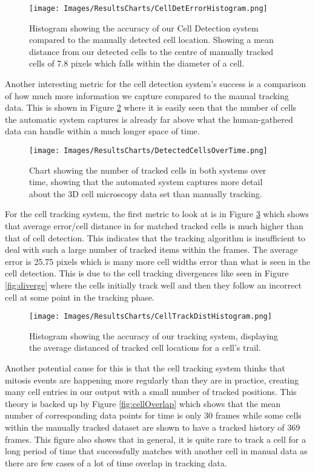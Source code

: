\documentclass[12pt a4paper]{article}
\begin{document}
\begin{figure}
    \centering
    \texttt{[image: Images/ResultsCharts/CellDetErrorHistogram.png]}
    \caption{Histogram showing the accuracy of our Cell Detection system compared to the manually detected cell location. Showing a mean distance from our detected cells to the centre of manually tracked cells of 7.8 pixels which falls within the diameter of a cell.}
    \label{fig:CellDetError}
\end{figure}

Another interesting metric for the cell detection system's success is a comparison of how much more information we capture compared to the manual tracking data. This is shown in Figure \ref{fig:numCellsDet} where it is easily seen that the number of cells the automatic system captures is already far above what the human-gathered data can handle within a much longer space of time.
\begin{figure}
    \centering
    \texttt{[image: Images/ResultsCharts/DetectedCellsOverTime.png]}
    \caption{Chart showing the number of tracked cells in both systems over time, showing that the automated system captures more detail about the 3D cell microscopy data set than manually tracking.}
    \label{fig:numCellsDet}
\end{figure}

For the cell tracking system, the first metric to look at is in Figure \ref{fig:cellTrackError} which shows that average error/cell distance in for matched tracked cells is much higher than that of cell detection. This indicates that the tracking algorithm is insufficient to deal with such a large number of tracked items within the frames. The average error is 25.75 pixels which is many more cell widths error than what is seen in the cell detection. This is due to the cell tracking divergences like seen in Figure \ref{fig:diverge} where the cells initially track well and then they follow an incorrect cell at some point in the tracking phase.



\begin{figure}
    \centering
    \texttt{[image: Images/ResultsCharts/CellTrackDistHistogram.png]}
    \caption{Histogram showing the accuracy of our tracking system, displaying the average distanced of tracked cell locations for a cell's trail.}
    \label{fig:cellTrackError}
\end{figure}
Another potential cause for this is that the cell tracking system thinks that mitosis events are happening more regularly than they are in practice, creating many cell entries in our output with a small number of tracked positions. This theory is backed up by Figure \ref{fig:cellOverlap} which shows that the mean number of corresponding data points for time is only 30 frames while some cells within the manually tracked dataset are shown to have a tracked history of 369 frames. This figure also shows that in general, it is quite rare to track a cell for a long period of time that successfully matches with another cell in manual data as there are few cases of a lot of time overlap in tracking data.
\end{document}
